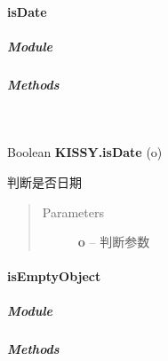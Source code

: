 \documentclass[letterpaper,10pt,english]{sphinxmanual}
\begin{document}
\paragraph{isDate}
\label{api/seed/lang/isDate:isdate}\label{api/seed/lang/isDate::doc}

\subparagraph{Module}
\label{api/seed/lang/isDate:module}\begin{quote}

{\hyperref[api/seed/lang/index:module-Lang]{}}
\end{quote}


\subparagraph{Methods}
\label{api/seed/lang/isDate:methods}

\begin{fulllineitems}
\label{api/seed/lang/isDate:Lang.KISSY.isDate}~
\begin{DUlineblock}{0em}
\item[] Boolean \textbf{KISSY.isDate} (o)
\item[] 判断是否日期
\end{DUlineblock}
\begin{quote}\begin{description}
\item[{Parameters}] \leavevmode
\textbf{o} -- 判断参数

\end{description}\end{quote}

\end{fulllineitems}



\paragraph{isEmptyObject}
\label{api/seed/lang/isEmptyObject::doc}\label{api/seed/lang/isEmptyObject:isemptyobject}

\subparagraph{Module}
\label{api/seed/lang/isEmptyObject:module}\begin{quote}

{\hyperref[api/seed/lang/index:module-Lang]{}}
\end{quote}


\subparagraph{Methods}
\label{api/seed/lang/isEmptyObject:methods}
\end{document}
